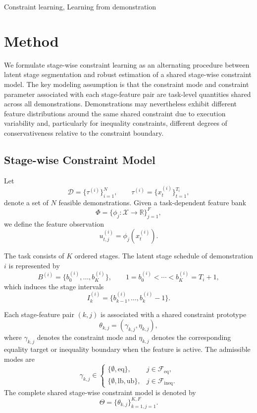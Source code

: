 \documentclass[lettersize,journal]{IEEEtran}
\begin{document}
\begin{IEEEkeywords}
Constraint learning, Learning from demonstration
\end{IEEEkeywords}
\section{Method}

We formulate stage-wise constraint learning as an alternating procedure between latent stage segmentation and robust estimation of a shared stage-wise constraint model. The key modeling assumption is that the constraint mode and constraint parameter associated with each stage-feature pair are task-level quantities shared across all demonstrations. Demonstrations may nevertheless exhibit different feature distributions around the same shared constraint due to execution variability and, particularly for inequality constraints, different degrees of conservativeness relative to the constraint boundary.

\subsection{Stage-wise Constraint Model}

Let
\[
\mathcal{D}
=
\{\tau^{(i)}\}_{i=1}^{N},
\qquad
\tau^{(i)}
=
\{x_t^{(i)}\}_{t=1}^{T_i},
\]
denote a set of $N$ feasible demonstrations. Given a task-dependent feature bank
\[
\Phi
=
\{\phi_j:\mathcal{X}\rightarrow\mathbb{R}\}_{j=1}^{F},
\]
we define the feature observation
\[
u_{t,j}^{(i)}
=
\phi_j(x_t^{(i)}).
\]

The task consists of $K$ ordered stages. The latent stage schedule of demonstration $i$ is represented by
\[
B^{(i)}
=
\{b_0^{(i)},\ldots,b_K^{(i)}\},
\qquad
1=b_0^{(i)}<\cdots<b_K^{(i)}=T_i+1,
\]
which induces the stage intervals
\[
I_k^{(i)}
=
\{b_{k-1}^{(i)},\ldots,b_k^{(i)}-1\}.
\]

Each stage-feature pair $(k,j)$ is associated with a shared constraint prototype
\[
\theta_{k,j}
=
(\gamma_{k,j},\eta_{k,j}),
\]
where $\gamma_{k,j}$ denotes the constraint mode and $\eta_{k,j}$ denotes the corresponding equality target or inequality boundary when the feature is active. The admissible modes are
\[
\gamma_{k,j}\in
\begin{cases}
\{\emptyset,\mathrm{eq}\},
& j\in\mathcal{F}_{\mathrm{eq}},\\
\{\emptyset,\mathrm{lb},\mathrm{ub}\},
& j\in\mathcal{F}_{\mathrm{ineq}}.
\end{cases}
\]
The complete shared stage-wise constraint model is denoted by
\[
\Theta
=
\{\theta_{k,j}\}_{k=1,j=1}^{K,F}.
\]
\end{document}
